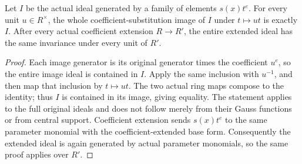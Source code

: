 \begin{lemma}
\label{lem:pl-parameter-monomial-ideal-invariance}
\leanok
Let $I$ be the actual ideal generated by a family of elements $s(x)t^e$.
For every unit $u\in R^\times$, the whole coefficient-substitution image
of $I$ under $t\mapsto ut$ is exactly $I$.  After every actual coefficient
extension $R\to R'$, the entire extended ideal has the same invariance
under every unit of $R'$.
\end{lemma}
\begin{proof}
Each image generator is its original generator times the coefficient
$u^e$, so the entire image ideal is contained in $I$.  Apply the same
inclusion with $u^{-1}$, and then map that inclusion by $t\mapsto ut$.
The two actual ring maps compose to the identity; thus $I$ is contained
in its image, giving equality.  The statement applies to the full
original ideals and does not follow merely from their Gauss functions
or from central support.  Coefficient extension sends $s(x)t^e$ to the
same parameter monomial with the coefficient-extended base form.
Consequently the extended ideal is again generated by actual parameter
monomials, so the same proof applies over $R'$.
\end{proof}
